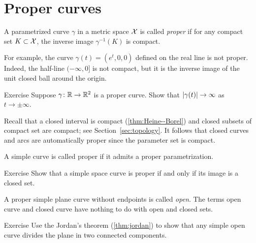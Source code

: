 \section{Proper curves}\label{sec:proper-curves}

A parametrized curve $\gamma$ in a metric space $\mathcal{X}$ is called \emph{proper} if for any compact set $K \subset \mathcal{X}$, the inverse image $\gamma^{-1}(K)$ is compact.

For example, the curve $\gamma(t)=(e^t,0,0)$ defined on the real line is not proper.
Indeed, the half-line $(-\infty,0]$ is not compact, but it is the inverse image of the unit closed ball around the origin.

\begin{thm}{Exercise}\label{ex:open-curve}
Suppose $\gamma\colon\mathbb{R}\to\mathbb{R}^2$ is a proper curve.
Show that  $|\gamma(t)|\z\to\infty$ as $t\to\pm\infty$.
\end{thm}


Recall that a closed interval is compact (\ref{thm:Heine--Borel}) and closed subsets of compact set are compact;
see Section~\ref{sec:topology}.
It follows that closed curves and arcs are automatically proper since the parameter set is compact.

A simple curve is called proper if it admits a proper parametrization.

\begin{thm}{Exercise}\label{ex:proper-closed}
Show that a simple space curve is proper if and only if its image is a closed set.

\end{thm}

A proper simple plane curve without endpoints is called \emph{open}.
The terms open curve and closed curve have nothing to do with open and closed sets.

\begin{thm}{Exercise}\label{ex:proper-curve}
Use the Jordan's theorem (\ref{thm:jordan}) to show that any simple open curve divides the plane in two connected components.  
\end{thm}



